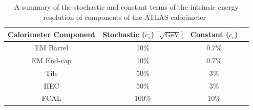 

{\renewcommand{\arraystretch}{1.2}
\begin{table}[!htb]
\centering
\begin{tabular}{|c||c|c|c|}
\hline
Calorimeter Component  & Stochastic ($c_s$) [$\sqrt{\text{GeV}}$]   & Constant ($c_c$)  \\
\hline
EM Barrel              & 10\%                                       & 0.7\%       \\
EM End-cap             & 10\%                                       & 0.7\%       \\
Tile                   & 50\%                                       &   3\%       \\
HEC                    & 50\%                                       &   3\%       \\
FCAL                   & 100\%                                      &  10\%       \\
\hline
\end{tabular}
\caption[A summary of the stochastic and constant terms of the intrinsic energy resolution of components of the ATLAS calorimeter.]
        {A summary of the stochastic and constant terms of the intrinsic energy resolution of components of the ATLAS calorimeter~\cite{det-ATLAS_Exp}}
\label{tab:det-calo_noise}
\end{table}
}


